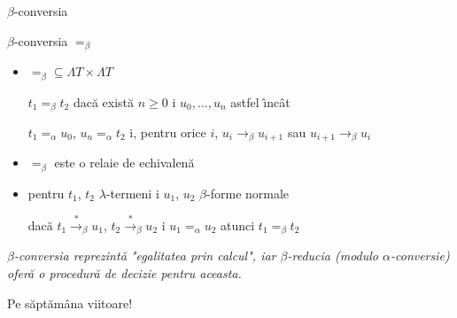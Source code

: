 \documentclass[xcolor=pdftex,romanian,colorlinks]{beamer}
\newcommand{\intens}[1] {{\color{DeepSkyBlue3} #1}}
\newcommand{\ra}{\rightarrow}
\newcommand{\sra}{\stackrel{*}{\rightarrow}}
\begin{document}
\begin{frame}[fragile]{$\beta$-conversia}
\begin{block}{$\beta$-conversia  $=_\beta$}
\begin{itemize}
\item $=_\beta\subseteq \Lambda T\times \Lambda T$

$t_1=_\beta  t_2$ dac\u a  exist\u a $n\geq 0$ \sh i $u_0,\ldots, u_n$ astfel \^{\i}nc\^{a}t

$t_1=_\alpha u_0$, $u_n =_\alpha t_2$ \sh i, pentru orice $i$,
$u_i\ra_\beta u_{i+1}$ sau $u_{i+1}\ra_\beta u_{i}$

\item $=_\beta$ este o rela\ts ie de echivalen\ts \u a\pause
\item pentru  $t_1$, $t_2$ $\lambda$-termeni \sh i $u_1$, $u_2$  $\beta$-forme normale 

dac\u a $t_1\sra_\beta u_1$, $t_2\sra_\beta u_2$ \sh i $u_1=_\alpha u_2$ atunci $t_1=_\beta t_2$
\end{itemize}
\end{block}

\medskip

{\it $\beta$-conversia reprezint\u a "egalitatea prin calcul", iar $\beta$-reduc\ts ia (modulo $\alpha$-conversie) ofer\u a o procedur\u a de decizie pentru aceasta. }
\end{frame}

\begin{frame}{}
\vfill\begin{center}
\intens{Pe s\u apt\u am\^ana viitoare!}
\end{center}
\vfill
\end{frame}
\end{document}

